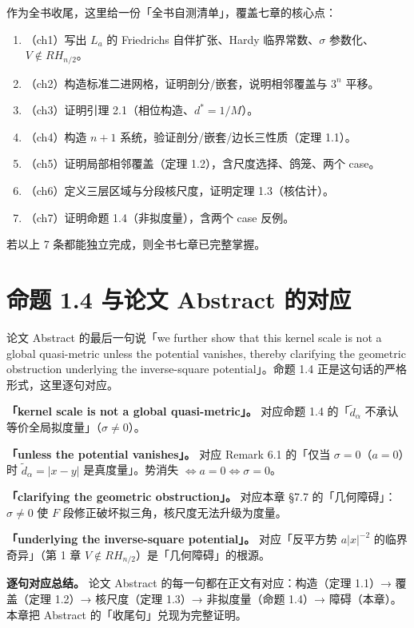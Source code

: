 \documentclass[a4paper,11pt,openany]{ctexbook}
\numberwithin{equation}{chapter}
\numberwithin{figure}{chapter}
\numberwithin{table}{chapter}
\begin{document}
作为全书收尾，这里给一份「全书自测清单」，覆盖七章的核心点：

\begin{enumerate}
\item （ch1）写出 $L_a$ 的 Friedrichs 自伴扩张、Hardy 临界常数、$\sigma$ 参数化、$V\notin RH_{n/2}$。
\item （ch2）构造标准二进网格，证明剖分/嵌套，说明相邻覆盖与 $3^n$ 平移。
\item （ch3）证明引理 2.1（相位构造、$d^*=1/M$）。
\item （ch4）构造 $n+1$ 系统，验证剖分/嵌套/边长三性质（定理 1.1）。
\item （ch5）证明局部相邻覆盖（定理 1.2），含尺度选择、鸽笼、两个 case。
\item （ch6）定义三层区域与分段核尺度，证明定理 1.3（核估计）。
\item （ch7）证明命题 1.4（非拟度量），含两个 case 反例。
\end{enumerate}

若以上 7 条都能独立完成，则全书七章已完整掌握。

\section{命题 1.4 与论文 Abstract 的对应}

论文 Abstract 的最后一句说「we further show that this kernel scale is not a global quasi-metric unless the potential vanishes, thereby clarifying the geometric obstruction underlying the inverse-square potential」。命题 1.4 正是这句话的严格形式，这里逐句对应。

\textbf{「kernel scale is not a global quasi-metric」。} 对应命题 1.4 的「$\widetilde d_\alpha$ 不承认等价全局拟度量」（$\sigma\neq0$）。

\textbf{「unless the potential vanishes」。} 对应 Remark 6.1 的「仅当 $\sigma=0$（$a=0$）时 $\widetilde d_\alpha=|x-y|$ 是真度量」。势消失 $\iff a=0\iff\sigma=0$。

\textbf{「clarifying the geometric obstruction」。} 对应本章 §7.7 的「几何障碍」：$\sigma\neq0$ 使 $F$ 段修正破坏拟三角，核尺度无法升级为度量。

\textbf{「underlying the inverse-square potential」。} 对应「反平方势 $a|x|^{-2}$ 的临界奇异」（第 1 章 $V\notin RH_{n/2}$）是「几何障碍」的根源。

\textbf{逐句对应总结。} 论文 Abstract 的每一句都在正文有对应：构造（定理 1.1）→ 覆盖（定理 1.2）→ 核尺度（定理 1.3）→ 非拟度量（命题 1.4）→ 障碍（本章）。本章把 Abstract 的「收尾句」兑现为完整证明。
\end{document}
